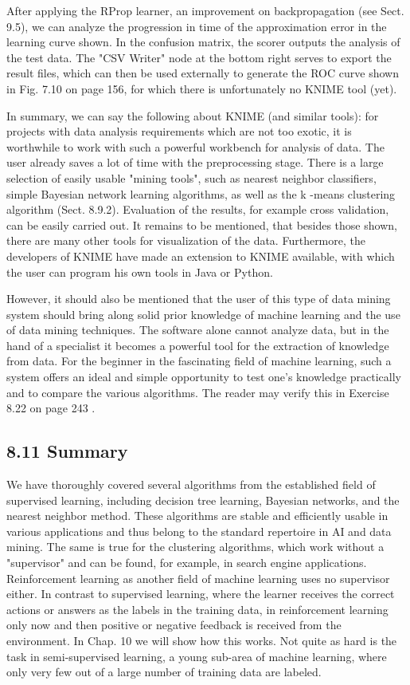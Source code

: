 \documentclass[10pt]{book}
\begin{document}
\begin{center}
\begin{enumerate}
\begin{center}
\begin{center}
\begin{center}
After applying the RProp learner, an improvement on backpropagation (see Sect. 9.5), we can analyze the progression in time of the approximation error in the learning curve shown. In the confusion matrix, the scorer outputs the analysis of the test data. The "CSV Writer" node at the bottom right serves to export the result files, which can then be used externally to generate the ROC curve shown in Fig. 7.10 on page 156, for which there is unfortunately no KNIME tool (yet).

In summary, we can say the following about KNIME (and similar tools): for projects with data analysis requirements which are not too exotic, it is worthwhile to work with such a powerful workbench for analysis of data. The user already saves a lot of time with the preprocessing stage. There is a large selection of easily usable "mining tools", such as nearest neighbor classifiers, simple Bayesian network learning algorithms, as well as the k -means clustering algorithm (Sect. 8.9.2). Evaluation of the results, for example cross validation, can be easily carried out. It remains to be mentioned, that besides those shown, there are many other tools for visualization of the data. Furthermore, the developers of KNIME have made an extension to KNIME available, with which the user can program his own tools in Java or Python.

However, it should also be mentioned that the user of this type of data mining system should bring along solid prior knowledge of machine learning and the use of data mining techniques. The software alone cannot analyze data, but in the hand of a specialist it becomes a powerful tool for the extraction of knowledge from data. For the beginner in the fascinating field of machine learning, such a system offers an ideal and simple opportunity to test one's knowledge practically and to compare the various algorithms. The reader may verify this in Exercise 8.22 on page 243 .

\subsection*{8.11 Summary}
We have thoroughly covered several algorithms from the established field of supervised learning, including decision tree learning, Bayesian networks, and the nearest neighbor method. These algorithms are stable and efficiently usable in various applications and thus belong to the standard repertoire in AI and data mining. The same is true for the clustering algorithms, which work without a "supervisor" and can be found, for example, in search engine applications. Reinforcement learning as another field of machine learning uses no supervisor either. In contrast to supervised learning, where the learner receives the correct actions or answers as the labels in the training data, in reinforcement learning only now and then positive or negative feedback is received from the environment. In Chap. 10 we will show how this works. Not quite as hard is the task in semi-supervised learning, a young sub-area of machine learning, where only very few out of a large number of training data are labeled.


\end{center}
\end{center}
\end{center}
\end{enumerate}
\end{center}
\end{document}
